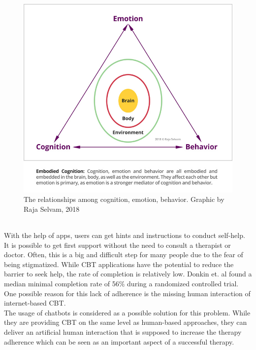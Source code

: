 \documentclass[sigconf, nonacm]{acmart}
\begin{document}
\begin{figure}[h]
  \centering
  \includegraphics[width=\linewidth]{cbt_picture}
  \caption[cbt_circle]{The relationships among cognition, emotion, behavior. Graphic by Raja Selvam, 2018\footnotemark}
  \label{fig:cbt_circle}
\end{figure}
\\
With the help of apps, users can get hints and instructions to conduct self-help. It is possible
to get first support without the need to consult a therapist or doctor. Often, this is a big and 
difficult step for many people due to the fear of being stigmatized\cite{Rossler2016}.
While CBT applications have the potential to reduce the barrier to seek help, the rate of completion
is relatively low. Donkin et. al \cite{Donkin} found a median minimal completion rate of 56\% during a randomized controlled trial. 
One possible reason for this lack of adherence is the missing human interaction of internet-based CBT\cite{Ly2017}.
\\
The usage of chatbots is considered as a possible solution for this problem. While they are providing CBT on the same level 
as human-based approaches, they can deliver an artificial human interaction that is supposed to increase the
therapy adherence which can be seen as an important aspect of a successful therapy.\cite{Suganuma2018} 
\end{document}
